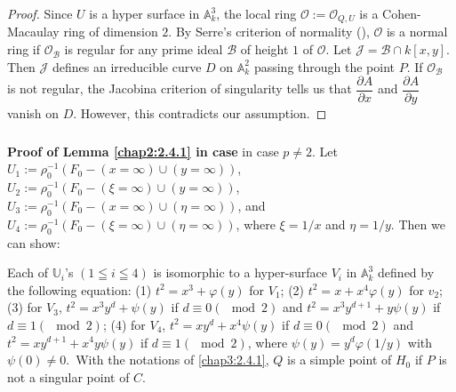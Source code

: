\begin{proof}
Since $U$ is a hyper surface in $\mathbb{A}^{3}_{k}$, the local ring
$\mathscr{O}:=\mathscr{O}_{Q,U}$ is a Cohen-Macaulay ring of dimension
$2$. By Serre's criterion of normality (\cf [17; IV (5.8.6)]),
$\mathscr{O}$ is a normal ring if $\mathscr{O}_{\mathscr{B}}$ is
regular for any prime ideal $\mathscr{B}$ of height $1$ of
$\mathscr{O}$. Let $\mathscr{J}=\mathscr{B}\cap k[x,y]$. Then
$\mathscr{J}$ defines an irreducible curve $D$ on $\mathbb{A}^{2}_{k}$
passing through the point $P$. If $\mathscr{O}_{\mathscr{B}}$ is not
regular, the Jacobina criterion of singularity tells us that
$\dfrac{\partial A}{\partial x}$ and $\dfrac{\partial A}{\partial y}$
vanish on $D$. However, this contradicts our assumption.
\end{proof}

\subsubsection{}\label{chap3:2.4.3}
\noindent \textbf{Proof of Lemma \ref{chap2:2.4.1} in case} 
in case $p\neq 2$. Let $U_{1}:=\rho^{-1}_{0}(F_{0}-(x=\infty)\cup
(y=\infty))$,
$U_{2}:=\rho^{-1}_{0}(F_{0}-(\xi=\infty)\cup(y=\infty))$,
$U_{3}:=\rho^{-1}_{0}(F_{0}-(x=\infty)\cup (\eta=\infty))$, and
$U_{4}:=\rho^{-1}_{0}(F_{0}-(\xi=\infty)\cup(\eta=\infty))$, where
$\xi=1/x$ and $\eta=1/y$. Then we can show:


\begin{lemma*}
Each of $\mathbb{U}_{i}$'s $(1\leqq i\leqq 4)$ is isomorphic to a
hyper-surface $V_{i}$ in $\mathbb{A}^{3}_{k}$ defined by the following
equation: {\rm(1)} $t^{2}=x^{3}+\varphi(y)$ for $V_{1}$; {\rm(2)}
$t^{2}=x+x^{4}\varphi(y)$ for $v_{2}$; {\rm(3)} for $V_{3}$,
$t^{2}=x^{3}y^{d}+\psi(y)$ if $d\equiv 0(\mod 2)$ and
$t^{2}=x^{3}y^{d+1}+y\psi(y)$ if $d\equiv 1(\mod 2)$; {\rm (4)} for
$V_{4}$, $t^{2}=xy^{d}+x^{4}\psi(y)$ if $d\equiv 0(\mod 2)$ and
$t^{2}=xy^{d+1}+x^{4}y\psi(y)$ if $d\equiv 1(\mod 2)$, where
$\psi(y)=y^{d}\varphi(1/y)$ with $\psi(0)\neq 0$.\pageoriginale\ With
the notations of \ref{chap3:2.4.1}, $Q$ is a simple point of $H_{0}$ if $P$
is not a singular point of $C$.
\end{lemma*}

